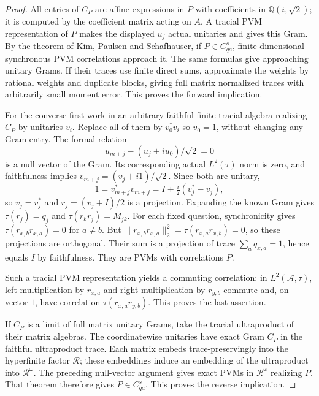 \documentclass[11pt]{article}
\theoremstyle{definition}
\theoremstyle{remark}
\providecommand{\R}{\mathcal R}
\begin{document}
\begin{proof}
All entries of $C_P$ are affine expressions in $P$ with coefficients in $\mathbb Q(i,\sqrt2)$; it is computed by the coefficient matrix acting on $A$. A tracial PVM representation of $P$ makes the displayed $u_j$ actual unitaries and gives this Gram. By the theorem of Kim, Paulsen and Schafhauser, if $P\in C_{qa}^s$, finite-dimensional synchronous PVM correlations approach it. The same formulas give approaching unitary Grams. If their traces use finite direct sums, approximate the weights by rational weights and duplicate blocks, giving full matrix normalized traces with arbitrarily small moment error. This proves the forward implication.

For the converse first work in an arbitrary faithful finite tracial algebra realizing $C_P$ by unitaries $v_i$. Replace all of them by $v_0^*v_i$ so $v_0=1$, without changing any Gram entry. The formal relation
\[
u_{m+j}-(u_j+i u_0)/\sqrt2=0
\]
is a null vector of the Gram. Its corresponding actual $L^2(\tau)$ norm is zero, and faithfulness implies
$v_{m+j}=(v_j+i1)/\sqrt2$. Since both are unitary,
\[
1=v_{m+j}^*v_{m+j}=I+\tfrac i2(v_j^*-v_j),
\]
so $v_j=v_j^*$ and $r_j=(v_j+I)/2$ is a projection. Expanding the known Gram gives $\tau(r_j)=q_j$ and $\tau(r_kr_j)=M_{jk}$. For each fixed question, synchronicity gives $\tau(r_{x,b}r_{x,a})=0$ for $a\ne b$. But $\|r_{x,b}r_{x,a}\|_2^2=\tau(r_{x,a}r_{x,b})=0$, so these projections are orthogonal. Their sum is a projection of trace $\sum_aq_{x,a}=1$, hence equals $I$ by faithfulness. They are PVMs with correlations $P$.

Such a tracial PVM representation yields a commuting correlation: in $L^2(\mathcal A,\tau)$, left multiplication by $r_{x,a}$ and right multiplication by $r_{y,b}$ commute and, on vector $1$, have correlation $\tau(r_{x,a}r_{y,b})$. This proves the last assertion.

If $C_P$ is a limit of full matrix unitary Grams, take the tracial ultraproduct of their matrix algebras. The coordinatewise unitaries have exact Gram $C_P$ in the faithful ultraproduct trace. Each matrix embeds trace-preservingly into the hyperfinite factor $\R$; these embeddings induce an embedding of the ultraproduct into $\R^\omega$. The preceding null-vector argument gives exact PVMs in $\R^\omega$ realizing $P$. That theorem therefore gives $P\in C_{qa}^s$. This proves the reverse implication.
\end{proof}
\end{document}
